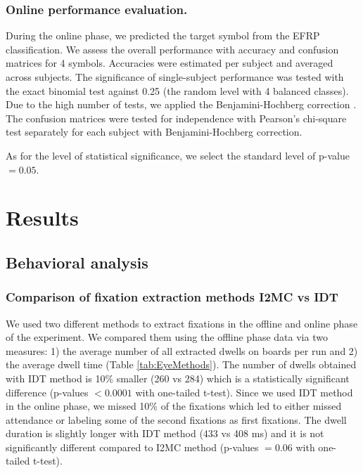 \documentclass[12pt]{iopart}
\begin{document}
\subsubsection*{Online performance evaluation.}
During the online phase, we predicted the target symbol from the EFRP classification.
We assess the overall performance with accuracy and confusion matrices
for 4 symbols. Accuracies were estimated per subject and averaged across subjects.
The significance of single-subject performance was tested with the exact binomial test against
0.25 (the random level with 4 balanced classes). Due to the high number of tests,
we applied the Benjamini-Hochberg correction \cite{benjamini_controlling_1995}.
The confusion matrices were tested for independence
with Pearson's chi-square test \cite{frs_x_1900} separately for each subject 
with Benjamini-Hochberg correction.

As for the level of statistical significance, we select the standard level of p-value $= 0.05$.

\section{Results}
\label{sec:results}
\subsection{Behavioral analysis}

\subsubsection*{Comparison of fixation extraction methods I2MC vs IDT}
We used two different methods to extract fixations in the offline 
and online phase of the experiment. We compared them using
the offline phase data via two measures: 1) the average number of all extracted
dwells on boards per run and 2) the average dwell time (Table \ref{tab:EyeMethods}).
The number of dwells obtained with IDT method is 10\% smaller (260 vs 284)
which is a statistically significant difference
(p-values $< 0.0001$ with one-tailed t-test).
Since we used IDT method in the online phase,
we missed 10\% of the fixations which led
to either missed attendance or labeling some of the second
fixations as first fixations.
The dwell duration is slightly longer with IDT method (433 vs 408 ms)
and it is not significantly different compared to I2MC method
(p-values $= 0.06$ with one-tailed t-test).
\end{document}
